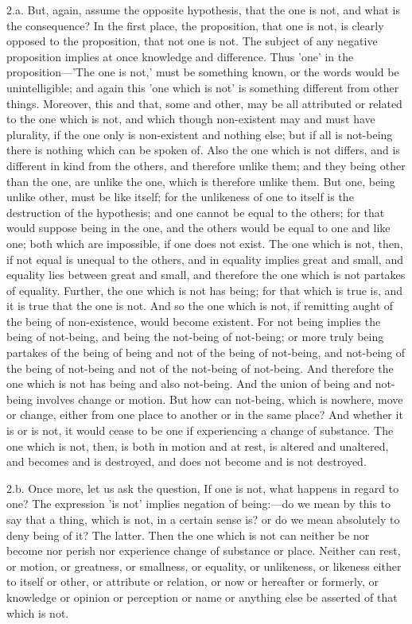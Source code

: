 \documentclass[11pt,letter]{article}
\begin{document}
\par  2.a. But, again, assume the opposite hypothesis, that the one is not, and what is the consequence? In the first place, the proposition, that one is not, is clearly opposed to the proposition, that not one is not. The subject of any negative proposition implies at once knowledge and difference. Thus 'one' in the proposition—'The one is not,' must be something known, or the words would be unintelligible; and again this 'one which is not' is something different from other things. Moreover, this and that, some and other, may be all attributed or related to the one which is not, and which though non-existent may and must have plurality, if the one only is non-existent and nothing else; but if all is not-being there is nothing which can be spoken of. Also the one which is not differs, and is different in kind from the others, and therefore unlike them; and they being other than the one, are unlike the one, which is therefore unlike them. But one, being unlike other, must be like itself; for the unlikeness of one to itself is the destruction of the hypothesis; and one cannot be equal to the others; for that would suppose being in the one, and the others would be equal to one and like one; both which are impossible, if one does not exist. The one which is not, then, if not equal is unequal to the others, and in equality implies great and small, and equality lies between great and small, and therefore the one which is not partakes of equality. Further, the one which is not has being; for that which is true is, and it is true that the one is not. And so the one which is not, if remitting aught of the being of non-existence, would become existent. For not being implies the being of not-being, and being the not-being of not-being; or more truly being partakes of the being of being and not of the being of not-being, and not-being of the being of not-being and not of the not-being of not-being. And therefore the one which is not has being and also not-being. And the union of being and not-being involves change or motion. But how can not-being, which is nowhere, move or change, either from one place to another or in the same place? And whether it is or is not, it would cease to be one if experiencing a change of substance. The one which is not, then, is both in motion and at rest, is altered and unaltered, and becomes and is destroyed, and does not become and is not destroyed.

\par  2.b. Once more, let us ask the question, If one is not, what happens in regard to one? The expression 'is not' implies negation of being:—do we mean by this to say that a thing, which is not, in a certain sense is? or do we mean absolutely to deny being of it? The latter. Then the one which is not can neither be nor become nor perish nor experience change of substance or place. Neither can rest, or motion, or greatness, or smallness, or equality, or unlikeness, or likeness either to itself or other, or attribute or relation, or now or hereafter or formerly, or knowledge or opinion or perception or name or anything else be asserted of that which is not.
\end{document}
